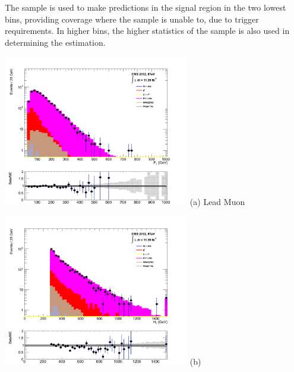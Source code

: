 \begin{itemize}
The \dimupjets sample is used to make predictions in the signal region in the two lowest \theht bins, providing coverage where the \gpjets sample is unable to, due to trigger requirements. In higher \theht bins, the higher statistics of the \gpjets sample is also used in determining the \zinv estimation.

\begin{minipage}{\linewidth}
\centering
\begin{minipage}{.48\textwidth}
\centering
\includegraphics[width = 3.2in]{plots/dimuon_leadmu_datamc.pdf}
(a) Lead Muon \pt
\end{minipage}
\begin{minipage}{.48\textwidth}
\centering
\includegraphics[width = 3.2in]{plots/dimuon_ht_datamc.pdf}
(b) \theht
\end{minipage}
\end{minipage}

\xspace


\end{itemize}
